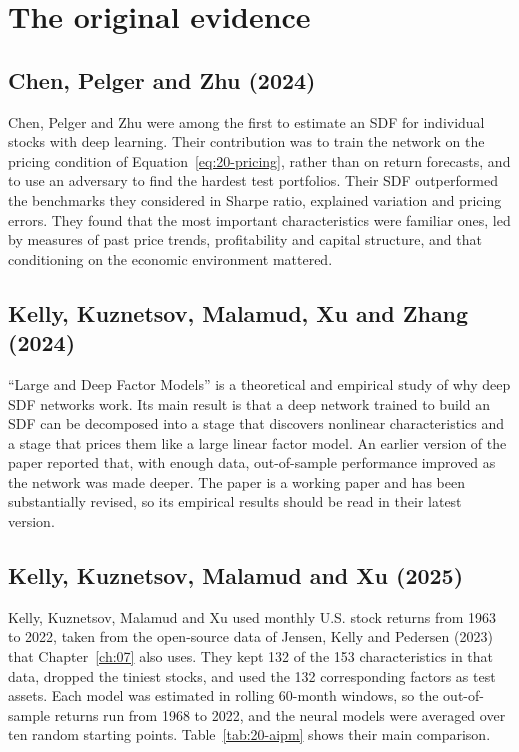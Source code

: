 \section{The original evidence}
\label{sec:20-evidence}

\subsection{Chen, Pelger and Zhu (2024)}

Chen, Pelger and Zhu were among the first to estimate an SDF for individual stocks with deep learning. Their contribution was to train the network on the pricing condition of Equation~\eqref{eq:20-pricing}, rather than on return forecasts, and to use an adversary to find the hardest test portfolios. Their SDF outperformed the benchmarks they considered in Sharpe ratio, explained variation and pricing errors. They found that the most important characteristics were familiar ones, led by measures of past price trends, profitability and capital structure, and that conditioning on the economic environment mattered.

\subsection{Kelly, Kuznetsov, Malamud, Xu and Zhang (2024)}

``Large and Deep Factor Models'' is a theoretical and empirical study of why deep SDF networks work. Its main result is that a deep network trained to build an SDF can be decomposed into a stage that discovers nonlinear characteristics and a stage that prices them like a large linear factor model. An earlier version of the paper reported that, with enough data, out-of-sample performance improved as the network was made deeper. The paper is a working paper and has been substantially revised, so its empirical results should be read in their latest version.

\subsection{Kelly, Kuznetsov, Malamud and Xu (2025)}

Kelly, Kuznetsov, Malamud and Xu used monthly U.S. stock returns from 1963 to 2022, taken from the open-source data of Jensen, Kelly and Pedersen (2023) that Chapter~\ref{ch:07} also uses. They kept 132 of the 153 characteristics in that data, dropped the tiniest stocks, and used the 132 corresponding factors as test assets. Each model was estimated in rolling 60-month windows, so the out-of-sample returns run from 1968 to 2022, and the neural models were averaged over ten random starting points. Table~\ref{tab:20-aipm} shows their main comparison.

